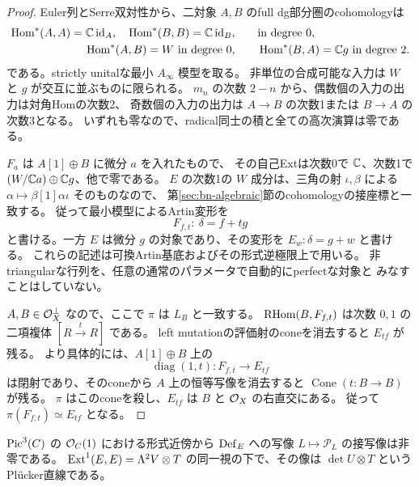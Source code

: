\begin{proof}
Euler列とSerre双対性から、二対象 $A,B$ のfull dg部分圏のcohomologyは
\[
 \begin{aligned}
 \operatorname{Hom}^*(A,A)=\mathbb C\operatorname{id}_A,\quad \operatorname{Hom}^*(B,B)=\mathbb C\operatorname{id}_B,
 &\qquad\text{in degree }0,\\
 \operatorname{Hom}^*(A,B)=W\text{ in degree }0,
 &\qquad\operatorname{Hom}^*(B,A)=\mathbb C g\text{ in degree }2.
 \end{aligned}
\]
である。strictly unitalな最小 $A_\infty$ 模型を取る。
非単位の合成可能な入力は $W$ と $g$ が交互に並ぶものに限られる。
$m_n$ の次数 $2-n$ から、偶数個の入力の出力は対角Homの次数2、
奇数個の入力の出力は $A\to B$ の次数1または $B\to A$ の次数3となる。
いずれも零なので、radical同士の積と全ての高次演算は零である。

$F_a$ は $A[1]\oplus B$ に微分 $a$ を入れたもので、
その自己Extは次数0で $\mathbb C$、次数1で $(W/\mathbb C a)\oplus\mathbb C g$、他で零である。
$E$ の次数1の $W$ 成分は、三角の射 $\iota,\beta$ による
$\alpha\mapsto\beta[1]\alpha\iota$ そのものなので、
第\ref{sec:bn-algebraic}節のcohomologyの接座標と一致する。
従って最小模型によるArtin変形\cite{ELOI,ELOII}を
\[
 F_{f,t}:\ \delta=f+t g
\]
と書ける。一方 $E$ は微分 $g$ の対象であり、その変形を
$E_w:\delta=g+w$ と書ける。
これらの記述は可換Artin基底およびその形式逆極限上で用いる。
非triangularな行列を、任意の通常のパラメータで自動的にperfectな対象と
みなすことはしていない。

$A,B\in\mathcal O_X^\perp$ なので、ここで $\pi$ は $L_B$ と一致する。
$\operatorname{RHom}(B,F_{f,t})$ は次数 $0,1$ の二項複体 $[R\xrightarrow{t}R]$ である。
left mutationの評価射のconeを消去すると $E_{tf}$ が残る。
より具体的には、$A[1]\oplus B$ 上の
\[
 \operatorname{diag}(1,t):F_{f,t}\longrightarrow E_{tf}
\]
は閉射であり、そのconeから $A$ 上の恒等写像を消去すると
$\operatorname{Cone}(t:B\to B)$ が残る。
$\pi$ はこのconeを殺し、$E_{tf}$ は $B$ と $\mathcal O_X$ の右直交にある。
従って $\pi(F_{f,t})\simeq E_{tf}$ となる。
\end{proof}

\begin{lemma}\label{lem:picard-gluing-ks}
$\operatorname{Pic}^3(C)$ の $\mathcal O_C(1)$ における形式近傍から $\operatorname{Def}_E$ への写像
$L\mapsto\mathcal P_L$ の接写像は非零である。
$\operatorname{Ext}^1(E,E)=\Lambda^2V\otimes T$ の同一視の下で、その像は
$\det U\otimes T$ というPl\"ucker直線である。
\end{lemma}

